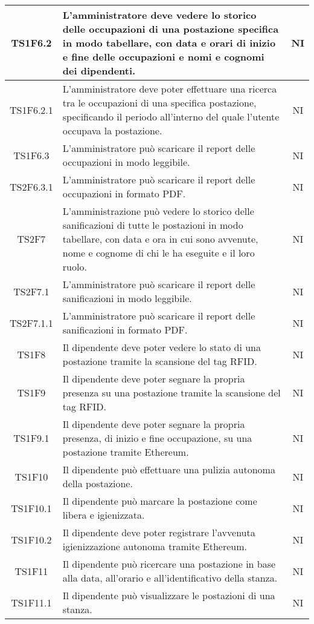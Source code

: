 \begin{center}
\begin{longtable}{|c|p{10cm}|c|}
			\hline
			TS1F6.2 & L'amministratore deve vedere lo storico delle occupazioni di una postazione specifica in modo tabellare, con data e orari di inizio e fine delle occupazioni e nomi e cognomi dei dipendenti. & NI \\		
			\hline
			TS1F6.2.1 & L'amministratore deve poter effettuare una ricerca tra le occupazioni di una specifica postazione, specificando il periodo all'interno del quale l'utente occupava la postazione. & NI \\		
			\hline
			TS1F6.3 & L'amministratore può scaricare il report delle occupazioni in modo leggibile. & NI \\		
			\hline
			TS2F6.3.1 & L'amministratore può scaricare il report delle occupazioni in formato PDF. & NI \\		
			\hline
			TS2F7 & L'amministrazione può vedere lo storico delle sanificazioni di tutte le postazioni in modo tabellare, con data e ora in cui sono avvenute, nome e cognome di chi le ha eseguite e il loro ruolo. & NI \\	
			\hline
			TS2F7.1 & L'amministratore può scaricare il report delle sanificazioni in modo leggibile. & NI \\	
			\hline
			TS2F7.1.1 & L'amministratore può scaricare il report delle sanificazioni in formato PDF. & NI \\	
			\hline
			TS1F8 & Il dipendente deve poter vedere lo stato di una postazione tramite la scansione del tag RFID. & NI \\	
			\hline
			TS1F9 & Il dipendente deve poter segnare la propria presenza su una postazione tramite la scansione del tag RFID. & NI \\	
			\hline
			TS1F9.1 & Il dipendente deve poter segnare la propria presenza, di inizio e fine occupazione, su una postazione tramite Ethereum. & NI \\	
			\hline
			TS1F10 & Il dipendente può effettuare una pulizia autonoma della postazione. & NI \\	
			\hline
			TS1F10.1 & Il dipendente può marcare la postazione come libera e igienizzata. & NI \\	
			\hline
			TS1F10.2 & Il dipendente deve poter registrare l'avvenuta igienizzazione autonoma tramite Ethereum. & NI \\	
			\hline
			TS1F11 & Il dipendente può ricercare una postazione in base alla data, all'orario e all'identificativo della stanza. & NI \\	
			\hline
			TS1F11.1 & Il dipendente può visualizzare le postazioni di una stanza. & NI \\	

\end{longtable}
\end{center}
